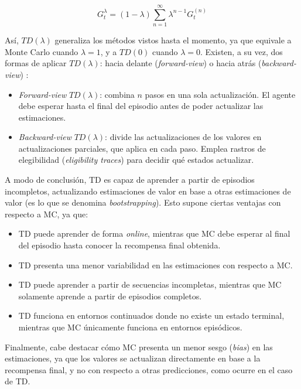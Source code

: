 \begin{equation}
    G^\lambda_t = (1-\lambda) \sum^{\infty}_{n=1}\lambda^{n-1} G^{(n)}_t
\end{equation}

Así, $TD(\lambda)$ generaliza los métodos vistos hasta el momento, ya que equivale a Monte Carlo cuando $\lambda = 1$, y a $TD(0)$ cuando $\lambda = 0$. Existen, a su vez, dos formas de aplicar $TD(\lambda)$: hacia delante (\textit{forward-view}) o hacia atrás (\textit{backward-view}) \cite{morales2020grokking}:

\begin{itemize}
    \item \textit{Forward-view} $TD(\lambda)$: combina $n$ pasos en una sola actualización. El agente debe esperar hasta el final del episodio antes de poder actualizar las estimaciones.
    \item \textit{Backward-view} $TD(\lambda)$: divide las actualizaciones de los valores en actualizaciones parciales, que aplica en cada paso. Emplea rastros de elegibilidad (\textit{eligibility traces}) para decidir qué estados actualizar.
\end{itemize}

A modo de conclusión, TD es capaz de aprender a partir de episodios incompletos, actualizando estimaciones de valor en base a otras estimaciones de valor (es lo que se denomina \textit{bootstrapping}). Esto supone ciertas ventajas con respecto a MC, ya que:

\begin{itemize}
    \item TD puede aprender de forma \textit{online}, mientras que MC debe esperar al final del episodio hasta conocer la recompensa final obtenida.
    \item TD presenta una menor variabilidad en las estimaciones con respecto a MC.
    \item TD puede aprender a partir de secuencias incompletas, mientras que MC solamente aprende a partir de episodios completos.
    \item TD funciona en entornos continuados donde no existe un estado terminal, mientras que MC únicamente funciona en entornos episódicos.
\end{itemize}

Finalmente, cabe destacar cómo MC presenta un menor sesgo (\textit{bias}) en las estimaciones, ya que los valores se actualizan directamente en base a la recompensa final, y no con respecto a otras predicciones, como ocurre en el caso de TD.

